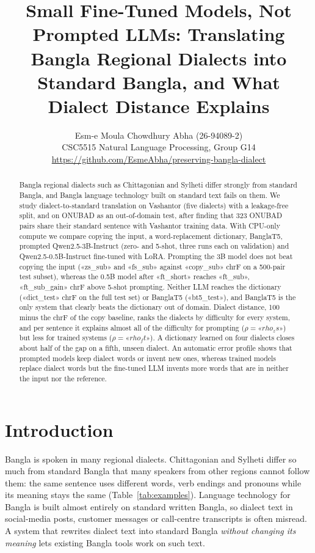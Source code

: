\documentclass[10pt,twocolumn]{article}
\title{\Large\textbf{Small Fine-Tuned Models, Not Prompted LLMs: Translating Bangla Regional Dialects into
Standard Bangla, and What Dialect Distance Explains}}
\author{Esm-e Moula Chowdhury Abha (26-94089-2)\\[2pt]
\small CSC5515 Natural Language Processing, Group G14\\
\small\url{https://github.com/EsmeAbha/preserving-bangla-dialect}}
\date{}
\begin{document}
\maketitle

\begin{abstract}
Bangla regional dialects such as Chittagonian and Sylheti differ strongly from standard Bangla, and Bangla
language technology built on standard text fails on them. We study dialect-to-standard translation on
Vashantor (five dialects) with a leakage-free split, and on ONUBAD as an out-of-domain test, after finding that
323 ONUBAD pairs share their standard sentence with Vashantor training data. With CPU-only compute we compare
copying the input, a word-replacement dictionary, BanglaT5, prompted Qwen2.5-3B-Instruct (zero- and 5-shot,
three runs each on validation) and Qwen2.5-0.5B-Instruct fine-tuned with LoRA. Prompting the 3B model does not
beat copying the input («zs_sub» and «fs_sub» against «copy_sub» chrF on a 500-pair test subset), whereas the
0.5B model after «ft_short» reaches «ft_sub», «ft_sub_gain» chrF above 5-shot prompting. Neither LLM reaches
the dictionary («dict_test» chrF on the full test set) or BanglaT5 («bt5_test»), and BanglaT5 is the only
system that clearly beats the dictionary out of domain. Dialect distance, 100 minus the chrF of the copy
baseline, ranks the dialects by difficulty for every system, and per sentence it explains almost all of the
difficulty for prompting ($\rho=«rho_zs»$) but less for trained systems ($\rho=«rho_ft»$). A dictionary
learned on four dialects closes about half of the gap on a fifth, unseen dialect. An automatic error profile
shows that prompted models keep dialect words or invent new ones, whereas trained models replace dialect words
but the fine-tuned LLM invents more words that are in neither the input nor the reference.
\end{abstract}

\section{Introduction}
Bangla is spoken in many regional dialects. Chittagonian and Sylheti differ so much from standard Bangla
that many speakers from other regions cannot follow them: the same sentence uses different words, verb
endings and pronouns while its meaning stays the same (Table~\ref{tab:examples}). Language technology for
Bangla is built almost entirely on standard written Bangla, so dialect text in social-media posts, customer
messages or call-centre transcripts is often misread. A system that rewrites dialect text into standard Bangla
\emph{without changing its meaning} lets existing Bangla tools work on such text.
\end{document}
